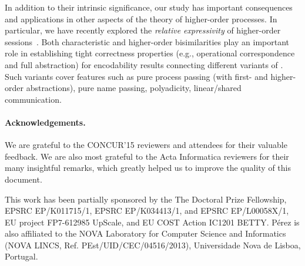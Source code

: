 In addition to their intrinsic significance, our study 
has important consequences and applications in other aspects of the theory of higher-order   processes. 
In particular,  we have recently explored the \emph{relative expressivity}
of higher-order sessions~\cite{DBLP:conf/esop/KouzapasPY16}.  
 Both characteristic and higher-order bisimilarities play an important role in establishing 
 tight correctness properties (e.g., operational correspondence and full abstraction) for encodability results connecting different variants of \HOp.
 Such variants cover
 features such as 
 pure process passing (with first- and higher-order abstractions), pure name passing, polyadicity, linear/shared communication. 

\paragraph{Acknowledgements.} 
We are grateful to the CONCUR'15 reviewers and attendees 
for their valuable feedback.
We are also most grateful to the Acta Informatica reviewers for their many insightful remarks, which greatly helped us to improve the quality of this document.

This work has been partially sponsored by the The Doctoral Prize Fellowship, EPSRC EP/K011715/1, EPSRC EP/K034413/1, and EPSRC EP/L00058X/1, EU project FP7-612985 UpScale, and EU COST Action IC1201 BETTY. P\'{e}rez is also affiliated to the NOVA Laboratory for Computer Science and Informatics (NOVA LINCS, Ref. PEst/UID/CEC/04516/2013), Universidade Nova de Lisboa, Portugal.
